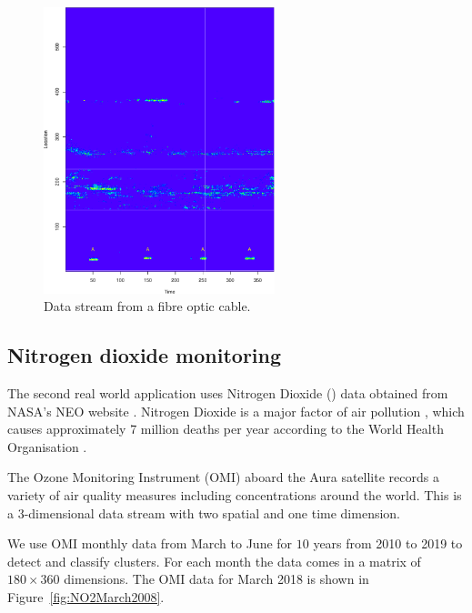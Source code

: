 \documentclass[a4paper,11pt]{article}
\begin{document}
\begin{figure}[!hb]
	\centering
	\includegraphics[width=0.6\textwidth]{./Graphics/Real_World_stream.pdf}
	\caption{Data stream from a fibre optic cable.}
  \label{fig:Real_World_Data_Stream}
\end{figure}

\subsection{Nitrogen dioxide monitoring}\label{sec:NO2ExpDat}

The second real world application uses Nitrogen Dioxide () data obtained from NASA's NEO website \citep{OMINO2}. Nitrogen Dioxide is a major factor of air pollution \citep{geddes2015long}, which causes approximately 7 million deaths per year according to the World Health Organisation \citep{whoair}.

The Ozone Monitoring Instrument (OMI) \citep{levelt2006ozone} aboard the Aura satellite records a variety of air quality measures including  concentrations around the world. This is a 3-dimensional data stream with two spatial and one time dimension.

We use OMI  monthly data from March to June for $10$ years from 2010 to 2019 to detect and classify  clusters. For each month the data comes in a matrix of $180 \times 360$ dimensions. The OMI  data for March 2018 is shown in Figure~\ref{fig:NO2March2008}.
\end{document}
